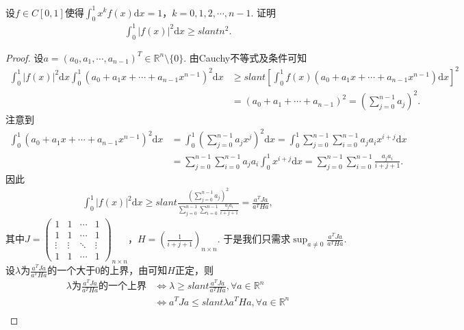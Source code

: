 \documentclass[../../main.tex]{subfiles}
\begin{document}
\begin{example}
设$f\in C[0,1]$使得$\int_{0}^{1}x^{k}f(x)\mathrm{d}x = 1$，$k = 0,1,2,\cdots,n - 1$. 证明
\begin{align*}
\int_{0}^{1}|f(x)|^{2}\mathrm{d}x\geqslant slant n^{2}.
\end{align*}
\end{example}
\begin{proof}
设$a=(a_0,a_1,\cdots,a_{n-1})^T\in\mathbb{R}^n\setminus\{0\}$. 由Cauchy不等式及条件可知
\begin{align*}
\int_0^1 |f(x)|^2\mathrm{d}x \int_0^1 (a_0 + a_1x + \cdots + a_{n-1}x^{n-1})^2\mathrm{d}x &\geqslant slant \left[ \int_0^1 f(x)(a_0 + a_1x + \cdots + a_{n-1}x^{n-1})\mathrm{d}x \right]^2 \\
&= (a_0 + a_1 + \cdots + a_{n-1})^2 = \left( \sum_{j=0}^{n-1}a_j \right)^2.
\end{align*}
注意到
\begin{align*}
\int_0^1 (a_0 + a_1x + \cdots + a_{n-1}x^{n-1})^2\mathrm{d}x &= \int_0^1 \left( \sum_{j=0}^{n-1}a_jx^j \right)^2\mathrm{d}x = \int_0^1 \sum_{j=0}^{n-1}\sum_{i=0}^{n-1}a_ja_ix^{i+j}\mathrm{d}x \\
&= \sum_{j=0}^{n-1}\sum_{i=0}^{n-1}a_ja_i \int_0^1 x^{i+j}\mathrm{d}x = \sum_{j=0}^{n-1}\sum_{i=0}^{n-1}\frac{a_ja_i}{i+j+1}.
\end{align*}
因此
\begin{align*}
\int_0^1 |f(x)|^2\mathrm{d}x \geqslant slant \frac{\left( \sum\limits_{j=0}^{n-1}a_j \right)^2}{\sum\limits_{j=0}^{n-1}\sum\limits_{i=0}^{n-1}\frac{a_ja_i}{i+j+1}} = \frac{a^TJa}{a^THa},
\end{align*}
其中$J=\begin{pmatrix}1 & 1 & \cdots & 1 \\ 1 & 1 & \cdots & 1 \\ \vdots & \vdots & \ddots & \vdots \\ 1 & 1 & \cdots & 1\end{pmatrix}_{n\times n}$，$H=\left( \frac{1}{i+j+1} \right)_{n\times n}$. 于是我们只需求$\sup_{a\neq 0}\frac{a^TJa}{a^THa}$. 设$\lambda$为$\frac{a^TJa}{a^THa}$的一个大于$0$的上界，由可知$H$正定，则
\begin{align*}
\lambda \text{为}\frac{a^TJa}{a^THa}\text{的一个上界} &\Longleftrightarrow \lambda \geqslant slant \frac{a^TJa}{a^THa}, \forall a\in\mathbb{R}^n \\
&\Longleftrightarrow a^TJa \leqslant slant \lambda a^THa, \forall a\in\mathbb{R}^n \\

\end{align*}
\end{proof}
\end{document}
